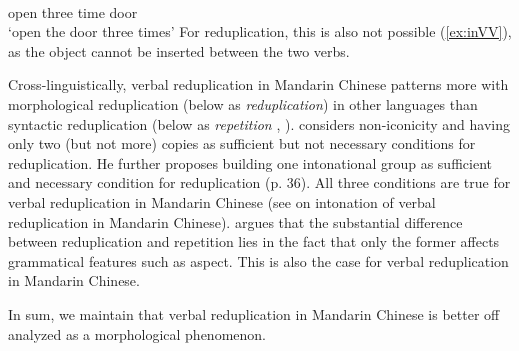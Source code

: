 \ex  \gll {}    \\
open three time door\\
\glt `open the door three times'
\z\z
For reduplication, this is also not possible (\ref{ex:inVV}), as the object cannot be inserted between the two verbs.
\ea\label{ex:inVV}

\z\z



Cross-linguistically, verbal reduplication in Mandarin Chinese patterns more with morphological reduplication (below as \textit{reduplication}) in other languages
than syntactic reduplication (below as \textit{repetition} \citealt[31]{Gil2005}, \citealt[1--2]{Forza2016}).
\citet[35--36]{Gil2005} considers non-iconicity and having only two (but not more) copies as sufficient but not necessary conditions for reduplication.
He further proposes building one intonational group as sufficient and necessary condition for reduplication (p. 36).
All three conditions are true for verbal reduplication in Mandarin Chinese (see \citealt[154]{Sui2018} on intonation of verbal reduplication in Mandarin Chinese).
\citet[9]{Forza2016} argues that the substantial difference between reduplication and repetition lies in the fact that only the former affects grammatical features such as aspect.
This is also the case for verbal reduplication in Mandarin Chinese.

In sum, we maintain that verbal reduplication in Mandarin Chinese is better off analyzed as a morphological phenomenon.






